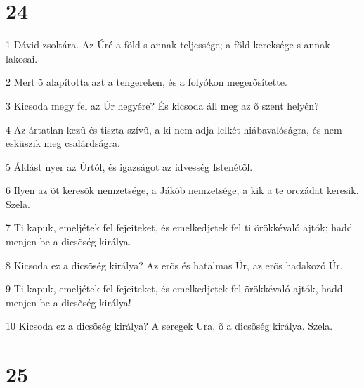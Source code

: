\chapter{24}

\par 1 Dávid zsoltára. Az Úré a föld s annak teljessége; a föld kereksége s annak lakosai.
\par 2 Mert õ alapította azt a tengereken, és a folyókon megerõsítette.
\par 3 Kicsoda megy fel az Úr hegyére? És kicsoda áll meg az õ szent helyén?
\par 4 Az ártatlan kezû és tiszta szívû, a ki nem adja lelkét hiábavalóságra, és nem esküszik meg csalárdságra.
\par 5 Áldást nyer az Úrtól, és igazságot az idvesség Istenétõl.
\par 6 Ilyen az õt keresõk nemzetsége, a Jákób nemzetsége, a kik a te orczádat keresik. Szela.
\par 7 Ti kapuk, emeljétek fel fejeiteket, és emelkedjetek fel ti örökkévaló ajtók; hadd menjen be a dicsõség királya.
\par 8 Kicsoda ez a dicsõség királya? Az erõs és hatalmas Úr, az erõs hadakozó Úr.
\par 9 Ti kapuk, emeljétek fel fejeiteket, és emelkedjetek fel örökkévaló ajtók, hadd menjen be a dicsõség királya!
\par 10 Kicsoda ez a dicsõség királya? A seregek Ura, õ a dicsõség királya. Szela.

\chapter{25}

